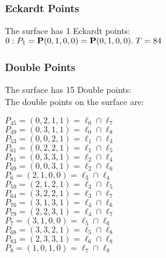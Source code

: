 \documentclass{article}
\newcommand{\bP}{{\bf P}}
\begin{document}
{\subsubsection*{Eckardt Points}
The surface has 1 Eckardt points:\\
$0 : P_{1}=\bP(0, 1, 0, 0) = \bP(0, 1, 0, 0).\; T= 84$\\
\subsubsection*{Double Points}
The surface has 15 Double points:\\
The double points on the surface are:\\
\begin{multicols}{2}
\noindent
$P_{45} = ( 0, 2, 1, 1 ) = \ell_{0} \cap \ell_{7} $\\
$P_{49} = ( 0, 3, 1, 1 ) = \ell_{0} \cap \ell_{8} $\\
$P_{53} = ( 0, 0, 2, 1 ) = \ell_{1} \cap \ell_{3} $\\
$P_{61} = ( 0, 2, 2, 1 ) = \ell_{1} \cap \ell_{5} $\\
$P_{81} = ( 0, 3, 3, 1 ) = \ell_{2} \cap \ell_{4} $\\
$P_{69} = ( 0, 0, 3, 1 ) = \ell_{2} \cap \ell_{6} $\\
$P_{6} = ( 2, 1, 0, 0 ) = \ell_{3} \cap \ell_{4} $\\
$P_{59} = ( 2, 1, 2, 1 ) = \ell_{3} \cap \ell_{5} $\\
$P_{64} = ( 3, 2, 2, 1 ) = \ell_{3} \cap \ell_{7} $\\
$P_{76} = ( 3, 1, 3, 1 ) = \ell_{4} \cap \ell_{6} $\\
$P_{79} = ( 2, 2, 3, 1 ) = \ell_{4} \cap \ell_{7} $\\
$P_{7} = ( 3, 1, 0, 0 ) = \ell_{5} \cap \ell_{6} $\\
$P_{68} = ( 3, 3, 2, 1 ) = \ell_{5} \cap \ell_{8} $\\
$P_{83} = ( 2, 3, 3, 1 ) = \ell_{6} \cap \ell_{8} $\\
$P_{8} = ( 1, 0, 1, 0 ) = \ell_{7} \cap \ell_{8} $\\
\end{multicols}
}
\end{document}
